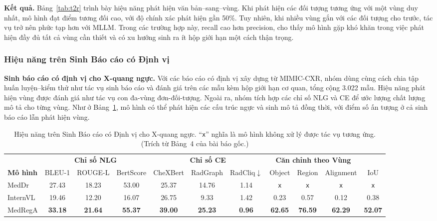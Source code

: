 \documentclass[12pt,a4paper,oneside]{extarticle}
\begin{document}
\noindent\textbf{Kết quả.} Bảng~\ref{tab:t2r} trình bày hiệu năng phát hiện văn bản--sang--vùng.
Khi phát hiện các đối tượng tương ứng với một vùng duy nhất, mô hình đạt điểm tương đối cao, với
độ chính xác phát hiện gần 50\%. Tuy nhiên, khi nhiều vùng gắn với các đối tượng cho trước, tác
vụ trở nên phức tạp hơn với MLLM. Trong các trường hợp này, recall cao hơn precision, cho thấy mô
hình gặp khó khăn trong việc phát hiện đầy đủ tất cả vùng cần thiết và có xu hướng sinh ra ít hộp
giới hạn một cách thận trọng.

\subsubsection{Hiệu năng trên Sinh Báo cáo có Định vị}

\noindent\textbf{Sinh báo cáo có định vị cho X-quang ngực.} Với các báo cáo có định vị xây dựng
từ MIMIC-CXR, nhóm dùng cùng cách chia tập huấn luyện--kiểm thử như tác vụ sinh báo cáo và đánh
giá trên các mẫu kèm hộp giới hạn cơ quan, tổng cộng 3.022 mẫu. Hiệu năng phát hiện vùng được
đánh giá như tác vụ con đa-vùng đơn-đối-tượng. Ngoài ra, nhóm tích hợp các chỉ số NLG và CE để
ước lượng chất lượng mô tả cho từng vùng. Như ở Bảng~\ref{tab:chestgrounded}, mô hình có thể phát
hiện các cấu trúc ngực và sinh mô tả đồng thời, với điểm số ấn tượng ở cả sinh báo cáo lẫn phát
hiện vùng.

\begin{table}[H]
\centering
\caption{Hiệu năng trên Sinh Báo cáo có Định vị cho X-quang ngực. ``\texttt{x}'' nghĩa là mô
hình không xử lý được tác vụ tương ứng. (Trích từ Bảng~4 của bài báo gốc.)}
\label{tab:chestgrounded}
\small
\setlength{\tabcolsep}{4pt}
\begin{adjustbox}{max width=\textwidth}
\begin{tabular}{lcccccccccc}
\toprule
 & \multicolumn{3}{c}{\textbf{Chỉ số NLG}} & \multicolumn{3}{c}{\textbf{Chỉ số CE}}
 & \multicolumn{3}{c}{\textbf{Căn chỉnh theo Vùng}} & \\
\cmidrule(lr){2-4}\cmidrule(lr){5-7}\cmidrule(lr){8-10}
\textbf{Mô hình} & BLEU-1 & ROUGE-L & BertScore & CheXBert & RadGraph & RadCliq$\downarrow$
 & Object & Region & Alignment & IoU \\
\midrule
MedDr    & 27.43 & 18.23 & 53.00 & 25.37 & 14.76 & 1.14 & \texttt{x} & \texttt{x} & \texttt{x} & \texttt{x} \\
InternVL & 19.46 & 12.20 & 16.07 & 26.75 & 9.33  & 1.42 & 0.23 & 0.57 & 0.12 & 0.38 \\
MedRegA  & \textbf{33.18} & \textbf{21.64} & \textbf{55.37} & \textbf{39.00} & \textbf{25.23} & \textbf{0.96} & \textbf{62.65} & \textbf{76.59} & \textbf{62.29} & \textbf{52.07} \\
\bottomrule
\end{tabular}
\end{adjustbox}
\end{table}
\end{document}
